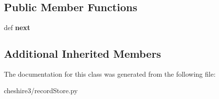 \subsection*{Public Member Functions}
\begin{DoxyCompactItemize}
\item 
\hypertarget{classcheshire3_1_1record_store_1_1_bdb_record_iter_a94ded0b26c92390337217c9e5c237383}{def {\bfseries next}}\label{classcheshire3_1_1record_store_1_1_bdb_record_iter_a94ded0b26c92390337217c9e5c237383}

\end{DoxyCompactItemize}
\subsection*{Additional Inherited Members}


The documentation for this class was generated from the following file\-:\begin{DoxyCompactItemize}
\item 
cheshire3/record\-Store.\-py\end{DoxyCompactItemize}
